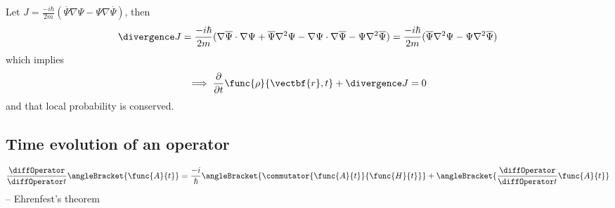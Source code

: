 Let \(J = \frac{-i\hbar}{2m} (\overline{\Psi} \nabla \Psi - \Psi \nabla \overline{\Psi} )\), then
\begin{equation*}
    \divergence J = \frac{-i\hbar}{2m} (\nabla \overline{\Psi} \cdot  \nabla \Psi + \overline{\Psi}  \nabla^2 \Psi - \nabla \Psi \cdot \nabla \overline{\Psi} - \Psi \nabla^2 \overline{\Psi}) = \frac{-i\hbar}{2m} (\overline{\Psi}  \nabla^2 \Psi  - \Psi \nabla^2 \overline{\Psi})
\end{equation*}
which implies
\begin{equation*}
    \implies \frac{\partial }{\partial t} \func{\rho}{\vectbf{r},t} + \divergence J = 0
\end{equation*}
and that local probability is conserved.
\subsection{Time evolution of an operator}
\begin{equation*}
    \frac{\diffOperator }{\diffOperator t}\angleBracket{\func{A}{t}}= \frac{-i}{\hbar} \angleBracket{\commutator{\func{A}{t}}{\func{H}{t}}} + \angleBracket{\dfrac{\diffOperator }{\diffOperator t} \func{A}{t}}
\end{equation*}
-- Ehrenfest's theorem
